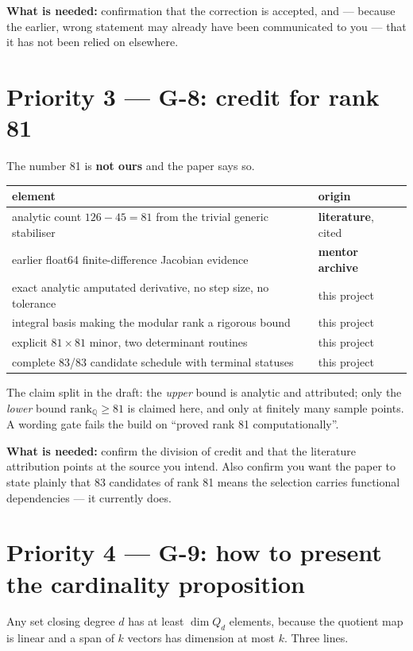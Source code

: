\documentclass[11pt,a4paper]{article}
\begin{document}
\textbf{What is needed:} confirmation that the correction is accepted, and ---
because the earlier, wrong statement may already have been communicated to you ---
that it has not been relied on elsewhere.

\section*{Priority 3 --- G-8: credit for rank 81}

The number 81 is \textbf{not ours} and the paper says so.

\begin{center}
\begin{tabular}{ll}
\toprule
element & origin \\
\midrule
analytic count $126-45=81$ from the trivial generic stabiliser & \textbf{literature}, cited \\
earlier float64 finite-difference Jacobian evidence & \textbf{mentor archive} \\
exact analytic amputated derivative, no step size, no tolerance & this project \\
integral basis making the modular rank a rigorous bound & this project \\
explicit $81\times81$ minor, two determinant routines & this project \\
complete 83/83 candidate schedule with terminal statuses & this project \\
\bottomrule
\end{tabular}
\end{center}

The claim split in the draft: the \emph{upper} bound is analytic and attributed;
only the \emph{lower} bound $\mathrm{rank}_{\mathbb{Q}} \ge 81$ is claimed here,
and only at finitely many sample points. A wording gate fails the build on
``proved rank 81 computationally''.

\textbf{What is needed:} confirm the division of credit and that the literature
attribution points at the source you intend. Also confirm you want the paper to
state plainly that 83 candidates of rank 81 means the selection carries
functional dependencies --- it currently does.

\section*{Priority 4 --- G-9: how to present the cardinality proposition}

Any set closing degree $d$ has at least $\dim Q_d$ elements, because the quotient
map is linear and a span of $k$ vectors has dimension at most $k$. Three lines.
\end{document}
